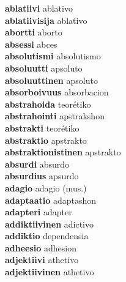 \textbf{ablatiivi } ablativo \\
\textbf{ablatiivisija } ablativo \\
\textbf{abortti } aborto \\
\textbf{absessi } abces \\
\textbf{absolutismi } absolutismo \\
\textbf{absoluutti } apsoluto \\
\textbf{absoluuttinen } apsoluto \\
\textbf{absorboivuus } absorbacion \\
\textbf{abstrahoida } teorétiko \\
\textbf{abstrahointi } apstrakshon \\
\textbf{abstrakti } teorétiko \\
\textbf{abstraktio } apstrakto \\
\textbf{abstraktionistinen } apstrakto \\
\textbf{absurdi } absurdo \\
\textbf{absurdius } apsurdo \\
\textbf{adagio } adagio (mus.) \\
\textbf{adaptaatio } adaptashon \\
\textbf{adapteri } adapter \\
\textbf{addiktiivinen } adictivo \\
\textbf{addiktio } dependensia \\
\textbf{adheesio } adhesion \\
\textbf{adjektiivi } athetivo \\
\textbf{adjektiivinen } athetivo \\
